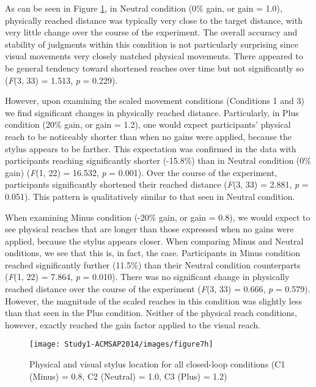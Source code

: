 As can be seen in Figure \ref{fig:PhysicalStylusC}, in Neutral condition (0\% gain, or gain = 1.0), physically reached distance was typically very close to the target distance, with very little change over the course of the experiment. The overall accuracy and stability of judgments within this condition is not particularly surprising since visual movements very closely matched physical movements. There appeared to be general tendency toward shortened reaches over time but not significantly so (\textit{F}(3, 33) = 1.513, \textit{p} = 0.229).

However, upon examining the scaled movement conditions (Conditions 1 and 3) we find significant changes in physically reached distance. Particularly, in Plus condition (20\% gain, or gain = 1.2), one would expect participants' physical reach to be noticeably shorter than when no gains were applied, because the stylus appears to be farther. This expectation was confirmed in the data with participants reaching significantly shorter (-15.8\%) than in Neutral condition (0\% gain) (\textit{F}(1, 22) = 16.532, \textit{p} = 0.001). Over the course of the experiment, participants significantly shortened their reached distance (\textit{F}(3, 33) = 2.881, \textit{p} = 0.051). This pattern is qualitatively similar to that seen in Neutral condition.

When examining Minus condition (-20\% gain, or gain = 0.8), we would expect to see physical reaches that are longer than those expressed when no gains were applied, because the stylus appears closer. When comparing Minus and Neutral onditions, we see that this is, in fact, the case. Participants in Minus condition reached significantly further (11.5\%) than their Neutral condition counterparts (\textit{F}(1, 22) = 7.864, \textit{p} = 0.010). There was no significant change in physically reached distance over the course of the experiment (\textit{F}(3, 33) = 0.666, \textit{p} = 0.579). However, the magnitude of the scaled reaches in this condition was slightly less than that seen in the Plus condition. Neither of the physical reach conditions, however, exactly reached the gain factor applied to the visual reach.

\begin{figure}[ht]
	\centering
	\texttt{[image: Study1-ACMSAP2014/images/figure7h]}
	\caption{Physical and visual stylus location for all closed-loop conditions (C1 (Minus) = 0.8, C2 (Neutral) = 1.0, C3 (Plus) = 1.2)}
	\label{fig:PhysicalStylusC}
\end{figure}

